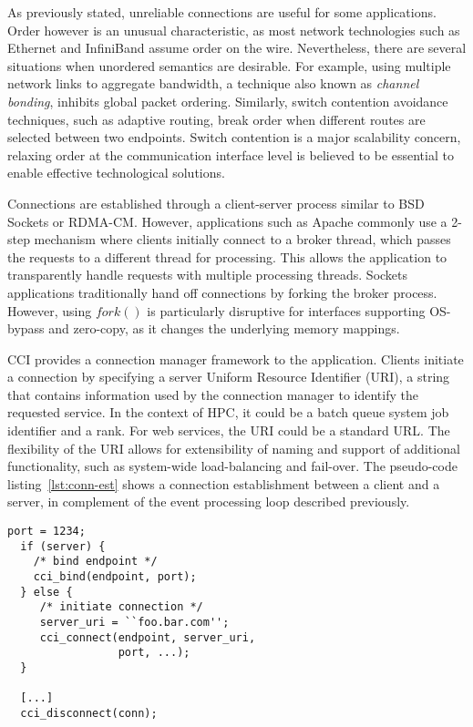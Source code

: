 As previously stated, unreliable connections are useful for some applications. 
Order however is an unusual characteristic, as most network technologies such 
as Ethernet and InfiniBand assume order on the wire. 
Nevertheless, there are several situations when unordered semantics are 
desirable. For example, using multiple network links to aggregate bandwidth, 
a technique also known as \emph{channel bonding}, inhibits global packet ordering. 
Similarly, switch contention avoidance techniques, 
such as adaptive routing, break order when different routes are selected 
between two endpoints. Switch contention is a major scalability concern, 
relaxing order at the communication interface level is believed to be 
essential to enable effective technological solutions.

Connections are established through a client-server process similar to 
BSD Sockets or RDMA-CM. However, applications such as 
Apache commonly use a 2-step mechanism where clients 
initially connect to a broker thread, which passes the requests to a 
different thread for processing. This allows the application to 
transparently handle requests with multiple processing threads. Sockets applications traditionally hand off connections by forking the broker process. However, using $fork()$ is particularly disruptive for interfaces supporting OS-bypass and zero-copy, as it changes the underlying memory mappings.

CCI provides a connection manager framework to 
the application. Clients initiate a connection by specifying a server 
Uniform Resource Identifier (URI), a string that contains information used 
by the connection manager to identify the requested service. In the context of 
HPC, it could be a batch queue system job identifier and a rank. For web 
services, the URI could be a standard URL. The flexibility of the URI allows 
for extensibility of naming and support of additional functionality, such as 
system-wide load-balancing and fail-over. The pseudo-code listing~\ref{lst:conn-est} shows a connection establishment between a client and a server, in complement of the event processing loop described previously.

\lstset{language=C, frame=single, basicstyle=\ttfamily\small}
\begin{lstlisting}[label=lst:conn-est,caption=CCI connection establishment example]
  port = 1234;
  if (server) {
    /* bind endpoint */
    cci_bind(endpoint, port);
  } else {
     /* initiate connection */
     server_uri = ``foo.bar.com'';
     cci_connect(endpoint, server_uri, 
                 port, ...);
  }

  [...]
  cci_disconnect(conn);
\end{lstlisting}

